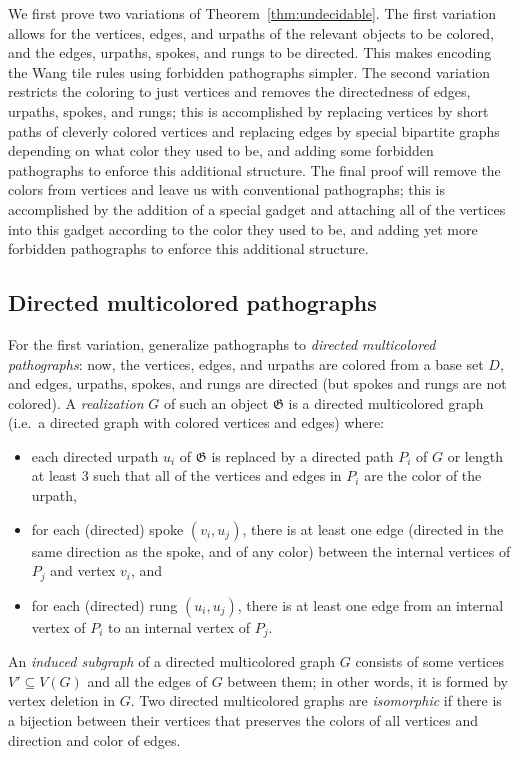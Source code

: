 \documentclass{article}
\newcommand{\Gf}{\mathfrak{G}}
\begin{document}
We first prove two variations of Theorem~\ref{thm:undecidable}. The first variation allows for the vertices, edges, and urpaths of the relevant objects to be colored, and the edges, urpaths, spokes, and rungs to be directed. This makes encoding the Wang tile rules using forbidden pathographs simpler. The second variation restricts the coloring to just vertices and removes the directedness of edges, urpaths, spokes, and rungs; this is accomplished by replacing vertices by short paths of cleverly colored vertices and replacing edges by special bipartite graphs depending on what color they used to be, and adding some forbidden pathographs to enforce this additional structure. The final proof will remove the colors from vertices and leave us with conventional pathographs; this is accomplished by the addition of a special gadget and attaching all of the vertices into this gadget according to the color they used to be, and adding yet more forbidden pathographs to enforce this additional structure.

\subsection{Directed multicolored pathographs}

For the first variation, generalize pathographs to \textit{directed multicolored pathographs}: now, the vertices, edges, and urpaths are colored from a base set $D$, and edges, urpaths, spokes, and rungs are directed (but spokes and rungs are not colored). A \textit{realization} $G$ of such an object $\Gf$ is a directed multicolored graph (i.e.\ a directed graph with colored vertices and edges) where:
\begin{itemize}
    \item each directed urpath $u_i$ of $\Gf$ is replaced by a directed path $P_i$ of $G$ or length at least 3 such that all of the vertices and edges in $P_i$ are the color of the urpath,
    \item for each (directed) spoke $(v_i,u_j)$, there is at least one edge (directed in the same direction as the spoke, and of any color) between the internal vertices of $P_j$ and vertex $v_i$, and
    \item for each (directed) rung $(u_i,u_j)$, there is at least one edge from an internal vertex of $P_i$ to an internal vertex of $P_j$.
\end{itemize}
An \textit{induced subgraph} of a directed multicolored graph $G$ consists of some vertices $V'\subseteq V(G)$ and all the edges of $G$ between them; in other words, it is formed by vertex deletion in $G$. Two directed multicolored graphs are \textit{isomorphic} if there is a bijection between their vertices that preserves the colors of all vertices and direction and color of edges.
\end{document}
